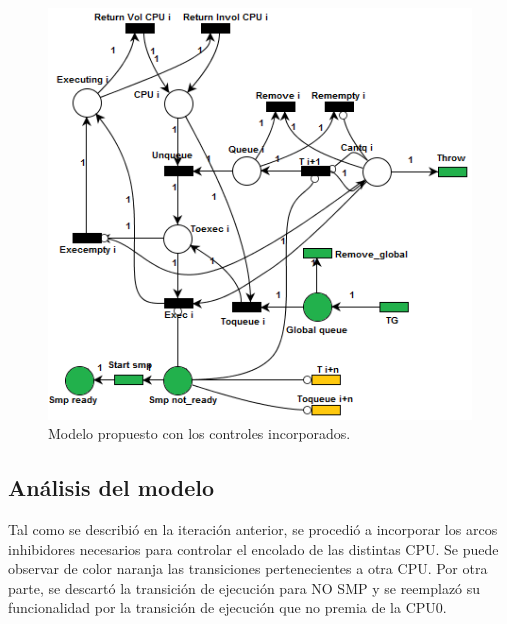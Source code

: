 \documentclass[a4paper]{book}
\begin{document}
\begin{figure} [H]
	\begin{center}
	    \includegraphics[scale=0.95]{./imagenes/it13modelored.png}
		\caption{Modelo propuesto con los controles incorporados.}
	\end{center}
\end{figure}

\subsection{An\'alisis del modelo}
Tal como se describi\'o en la iteraci\'on anterior, se procedi\'o a incorporar los arcos inhibidores necesarios para controlar el encolado de las distintas CPU. Se puede observar de color naranja las transiciones pertenecientes a otra CPU. Por otra parte, se descart\'o la transici\'on de ejecuci\'on para NO SMP y se reemplaz\'o su funcionalidad por la transici\'on de ejecuci\'on que no premia de la CPU0.\\
\end{document}
